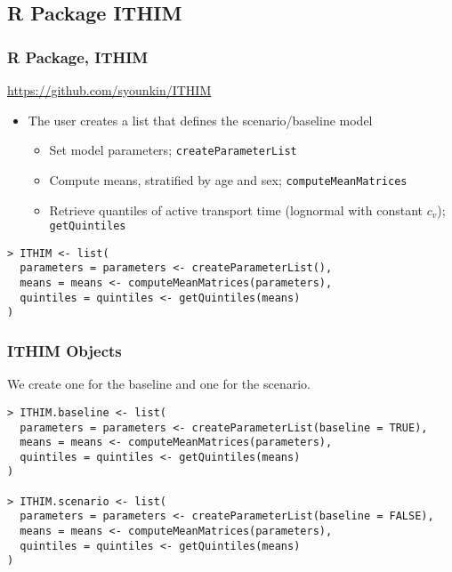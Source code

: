 \documentclass[handout,13pt,compress,c]{beamer}
\newcommand{\bi}{\begin{itemize}}
\newcommand{\ei}{\end{itemize}}
\begin{document}
\subsection{R Package ITHIM}
\begin{frame}[fragile]
\frametitle{R Package, ITHIM}
\begin{center}\url{https://github.com/syounkin/ITHIM}\end{center}
\bigskip
\bi
\item The user creates a list that defines the scenario/baseline model
\bi \item Set model parameters; \texttt{createParameterList}\item Compute means, stratified by age and sex; \texttt{computeMeanMatrices} \item Retrieve quantiles of active transport time (lognormal with constant $c_v$); \texttt{getQuintiles}\ei
\ei
\begin{semiverbatim}
\begin{lstlisting}
> ITHIM <- list(
  parameters = parameters <- createParameterList(),
  means = means <- computeMeanMatrices(parameters),
  quintiles = quintiles <- getQuintiles(means)
)
\end{lstlisting}
\end{semiverbatim}
\end{frame}
\begin{frame}[fragile]
\frametitle{ITHIM Objects}
We create one for the baseline and one for the scenario.
\begin{semiverbatim}
\begin{lstlisting}
> ITHIM.baseline <- list(
  parameters = parameters <- createParameterList(baseline = TRUE),
  means = means <- computeMeanMatrices(parameters),
  quintiles = quintiles <- getQuintiles(means)
)

> ITHIM.scenario <- list(
  parameters = parameters <- createParameterList(baseline = FALSE),
  means = means <- computeMeanMatrices(parameters),
  quintiles = quintiles <- getQuintiles(means)
)
\end{lstlisting}
\end{semiverbatim}
\end{frame}
\end{document}
